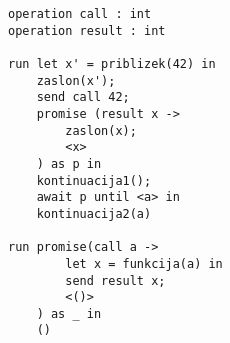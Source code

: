 \begin{lstlisting}[caption={Asinhron Vzporeden primer.},label={prog:primer-1},float,floatplacement=h]
operation call : int
operation result : int
 
run let x' = priblizek(42) in
    zaslon(x');
    send call 42;
    promise (result x ->
    	zaslon(x);
    	<x>
    ) as p in
    kontinuacija1();
    await p until <a> in
    kontinuacija2(a)

run promise(call a ->
    	let x = funkcija(a) in
    	send result x;
    	<()>
    ) as _ in
    ()
\end{lstlisting}
